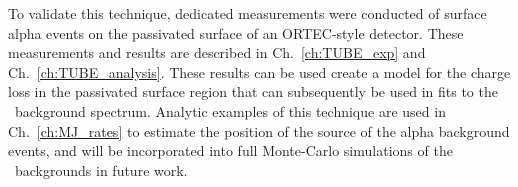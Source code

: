 To validate this technique, dedicated measurements were conducted of surface alpha events on the passivated surface of an ORTEC-style detector. These measurements and results are described in Ch.~\ref{ch:TUBE_exp} and Ch.~\ref{ch:TUBE_analysis}. These results can be used create a model for the charge loss in the passivated surface region that can subsequently be used in fits to the \MJ\ background spectrum. Analytic examples of this technique are used in Ch.~\ref{ch:MJ_rates} to estimate the position of the source of the alpha background events, and will be incorporated into full Monte-Carlo simulations of the \MJ\ backgrounds in future work. 

